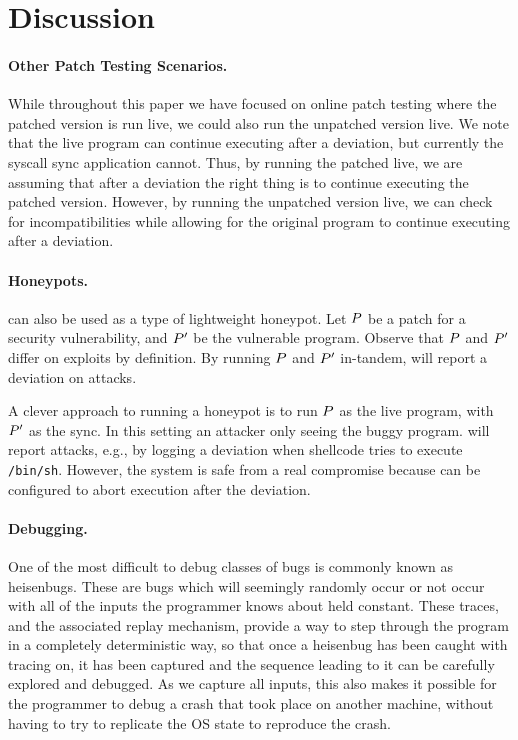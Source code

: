 \section{Discussion}
\label{tach:sec:discussion}

\paragraph{Other Patch Testing Scenarios.} While throughout this paper we have focused on online patch testing
where the patched version is run live, we could also run the unpatched
version live.  We note that the live program can continue executing
after a deviation, but currently the syscall sync application cannot.
Thus, by running the patched live, we are assuming that after a
deviation the right thing is to continue executing the patched
version.  However, by running the  unpatched version live, we can
check for incompatibilities while allowing for the original program to
continue executing after a deviation.

\paragraph{Honeypots.} \tachyon can also be used as a type of
lightweight honeypot. Let $P$ be a patch for a security
vulnerability, and $P'$ be the vulnerable program. Observe
that $P$ and $P'$ differ on exploits by definition.  By
running $P$ and $P'$ in-tandem, \tachyon will report a
deviation on attacks.

A clever approach to running a honeypot is to run $P$ as the live
program, with $P'$ as the sync. In this setting an attacker
only seeing the buggy program. \tachyon will report attacks, e.g., by
logging a deviation when shellcode tries to execute \texttt{/bin/sh}.
However, the system is safe from a real compromise because \tachyon
can be configured to abort execution after the deviation.



\paragraph{Debugging.} One of the most difficult to debug classes of
bugs is commonly known as heisenbugs. These are bugs which will
seemingly randomly occur or not occur with all of the inputs the
programmer knows about held constant. These traces, and the
associated replay mechanism, provide a way to step through the program
in a completely deterministic way, so that once a heisenbug has been
caught with tracing on, it has been captured and the sequence leading
to it can be carefully explored and debugged. As we capture all
inputs, this also makes it possible for the programmer to debug a
crash that took place on another machine, without having to try to
replicate the OS state to reproduce the crash.

